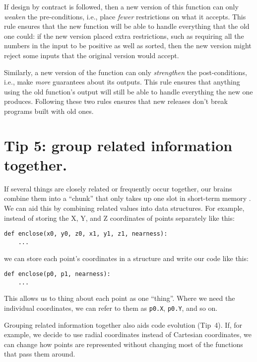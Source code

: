 \documentclass[10pt,letterpaper]{article}
\begin{document}
If design by contract is followed,
then a new version of this function can only \emph{weaken} the pre-conditions,
i.e.,
place \emph{fewer} restrictions on what it accepts.
This rule ensures that the new function will be able to handle
everything that the old one could:
if the new version placed extra restrictions,
such as requiring all the numbers in the input to be positive as well as sorted,
then the new version might reject some inputs that the original version would accept.

Similarly,
a new version of the function can only \emph{strengthen} the post-conditions,
i.e.,
make \emph{more} guarantees about its outputs.
This rule ensures that anything using the old function's output
will still be able to handle everything the new one produces.
Following these two rules ensures that new releases don't break programs built with old ones.

\section*{Tip 5: group related information together.}

If several things are closely related or frequently occur together,
our brains combine them into a ``chunk''
that only takes up one slot in short-term memory \cite{Thalmann2019}.
We can aid this by combining related values into data structures.
For example,
instead of storing the X, Y, and Z coordinates of points separately like this:

\begin{lstlisting}
def enclose(x0, y0, z0, x1, y1, z1, nearness):
    ...
\end{lstlisting}

\noindent
we can store each point's coordinates in a structure
and write our code like this:

\begin{lstlisting}
def enclose(p0, p1, nearness):
    ...
\end{lstlisting}

\noindent
This allows us to thing about each point as one ``thing''.
Where we need the individual coordinates,
we can refer to them as \texttt{p0.X}, \texttt{p0.Y}, and so on.

Grouping related information together also aids code evolution (Tip~4).
If, for example, we decide to use radial coordinates instead of Cartesian coordinates,
we can change how points are represented without changing most of the functions that pass them around.
\end{document}
